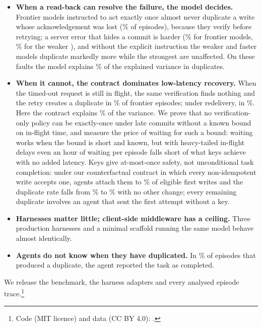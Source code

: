 \begin{itemize}[leftmargin=1.2em,itemsep=2pt]
\item \textbf{When a read-back can resolve the failure, the model decides.} Frontier models instructed to
act exactly once almost never duplicate a write whose acknowledgement was lost (\FrontierPostDSR{}\% of
episodes), because they verify before retrying; a server error that hides a commit is harder (\FrontierHttpPostDSR{}\%
for frontier models, \WeakHttpPostDSR{}\% for the weaker \WeakList{}), and without the
explicit instruction the weaker and faster models duplicate markedly more while the strongest are unaffected.
On these faults the model explains \ShareModelOneRes{}\% of the explained variance in duplicates.
\item \textbf{When it cannot, the contract dominates low-latency recovery.} When the timed-out request is still in flight, the
same verification finds nothing and the retry creates a duplicate in \FrontierLateDSR{}\% of frontier
episodes; under redelivery, in \FrontierRedelivDSR{}\%. Here the contract explains \ShareContractOneUnres{}\% of
the variance. We prove that no verification-only policy can be exactly-once under late commits without a known
bound on in-flight time, and measure the price of waiting for such a bound: waiting works when the bound is short
and known, but with heavy-tailed in-flight delays even an hour of waiting per episode falls short of what keys
achieve with no added latency. Keys give at-most-once safety, not unconditional task completion: under our
counterfactual contract in which every non-idempotent write accepts one, agents attach them to
\EKeysVanillaKeyUse{}\% of eligible first writes and the duplicate rate falls from \ETwoVanillaDSR{}\%
to \EKeysVanillaDSR{}\% with no other change; every remaining duplicate involves an agent that sent the first attempt
without a key.
\item \textbf{Harnesses matter little; client-side middleware has a ceiling.} Three production harnesses and a
minimal scaffold running the same model behave almost identically. \GuardSummary{}
\item \textbf{Agents do not know when they have duplicated.} In \CompletedGivenDup{}\% of episodes that
produced a duplicate, the agent reported the task as completed.
\end{itemize}

We release the benchmark, the harness adapters and every analysed episode trace\CodeCite.\footnote{Code (MIT licence) and
data (CC BY 4.0): \CodeURL.}
